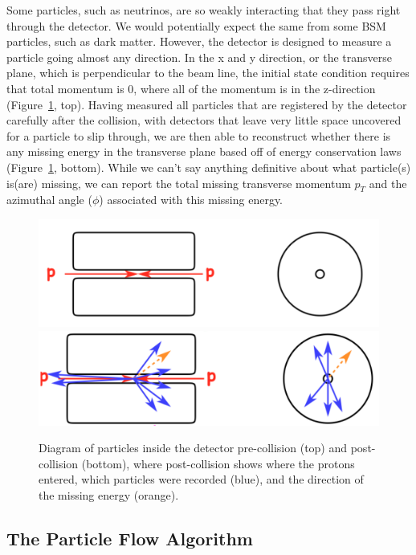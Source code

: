 Some particles, such as neutrinos, are so weakly interacting that they pass right through the detector. We would potentially expect the same from some BSM particles, such as dark matter. However, the detector is designed to measure a particle going almost any direction. In the x and y direction, or the transverse plane, which is perpendicular to the beam line, the initial state condition requires that total momentum is 0, where all of the momentum is in the z-direction (Figure~\ref{prepostCollision}, top). Having measured all particles that are registered by the detector carefully after the collision, with detectors that leave very little space uncovered for a particle to slip through, we are then able to reconstruct whether there is any missing energy in the transverse plane based off of energy conservation laws (Figure~\ref{prepostCollision}, bottom). While we can't say anything definitive about what particle(s) is(are) missing, we can report the total missing transverse momentum $p_{T}$ and the azimuthal angle ($\phi$) associated with this missing energy.
\begin{figure}[h!]
\centering
\includegraphics[width=\textwidth]{F3/preCollision.png}\\
\includegraphics[width=\textwidth]{F3/postCollision.png}
\caption{Diagram of particles inside the detector pre-collision (top) and post-collision (bottom), where post-collision shows where the protons entered, which particles were recorded (blue), and the direction of the missing energy (orange).}
\label{prepostCollision}
\end{figure}

\vspace{5mm}
\subsection{The Particle Flow Algorithm}

